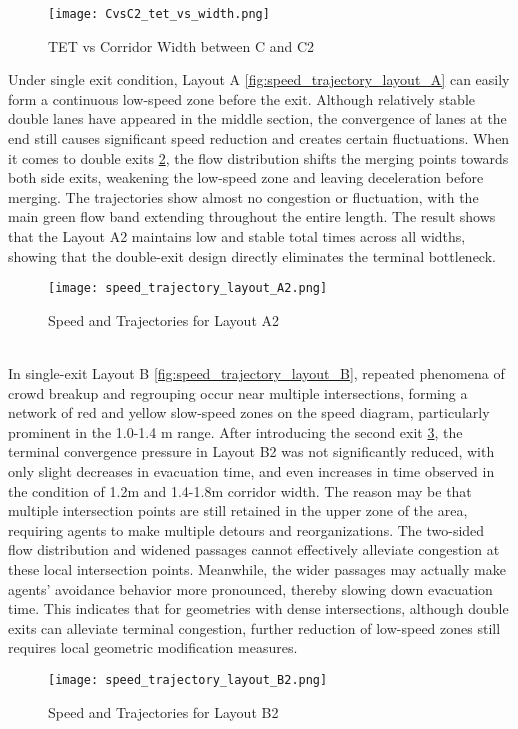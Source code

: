 \begin{figure}[h]
    \texttt{[image: CvsC2\_tet\_vs\_width.png]}
    \caption{TET vs Corridor Width between C and C2}\label{fig:CvsC2_tet_vs_width}
\end{figure}
Under single exit condition, Layout A \ref{fig:speed_trajectory_layout_A} can easily form a continuous low-speed zone before the exit. Although relatively stable double lanes have appeared in the middle section, the convergence of lanes at the end still causes significant speed reduction and creates certain fluctuations. When it comes to double exits \ref{fig:speed_trajectory_layout_A2}, the flow distribution shifts the merging points towards both side exits, weakening the low-speed zone and leaving deceleration before merging. The trajectories show almost no congestion or fluctuation, with the main green flow band extending throughout the entire length. The result shows that the Layout A2 maintains low and stable total times across all widths, showing that the double-exit design directly eliminates the terminal bottleneck.
\begin{figure}[h]
    \texttt{[image: speed\_trajectory\_layout\_A2.png]}
    \caption{Speed and Trajectories for Layout A2}\label{fig:speed_trajectory_layout_A2}
\end{figure}
\\In single-exit Layout B \ref{fig:speed_trajectory_layout_B}, repeated phenomena of crowd breakup and regrouping occur near multiple intersections, forming a network of red and yellow slow-speed zones on the speed diagram, particularly prominent in the 1.0-1.4 m range. After introducing the second exit \ref{fig:speed_trajectory_layout_B2}, the terminal convergence pressure in Layout B2 was not significantly reduced, with only slight decreases in evacuation time, and even increases in time observed in the condition of 1.2m and 1.4-1.8m corridor width. The reason may be that multiple intersection points are still retained in the upper zone of the area, requiring agents to make multiple detours and reorganizations. The two-sided flow distribution and widened passages cannot effectively alleviate congestion at these local intersection points. Meanwhile, the wider passages may actually make agents' avoidance behavior more pronounced, thereby slowing down evacuation time. This indicates that for geometries with dense intersections, although double exits can alleviate terminal congestion, further reduction of low-speed zones still requires local geometric modification measures.
\begin{figure}[h]
    \texttt{[image: speed\_trajectory\_layout\_B2.png]}
    \caption{Speed and Trajectories for Layout B2}\label{fig:speed_trajectory_layout_B2}
\end{figure}
